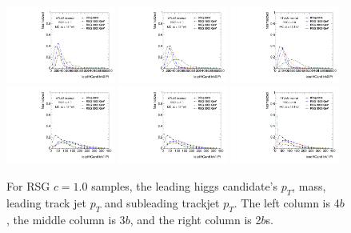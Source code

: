 \begin{figure}[htbp!]
\begin{center}
\includegraphics[width=0.32\textwidth,angle=-90]{figures/boosted/Truth/Moriond_comp_0_FourTag_Signal_leadHCand_trk0_Pt.pdf}
\includegraphics[width=0.32\textwidth,angle=-90]{figures/boosted/Truth/Moriond_comp_0_ThreeTag_Signal_leadHCand_trk0_Pt.pdf}
\includegraphics[width=0.32\textwidth,angle=-90]{figures/boosted/Truth/Moriond_comp_0_TwoTag_split_Signal_leadHCand_trk0_Pt.pdf}\\
\includegraphics[width=0.32\textwidth,angle=-90]{figures/boosted/Truth/Moriond_comp_0_FourTag_Signal_leadHCand_trk1_Pt.pdf}
\includegraphics[width=0.32\textwidth,angle=-90]{figures/boosted/Truth/Moriond_comp_0_ThreeTag_Signal_leadHCand_trk1_Pt.pdf}
\includegraphics[width=0.32\textwidth,angle=-90]{figures/boosted/Truth/Moriond_comp_0_TwoTag_split_Signal_leadHCand_trk1_Pt.pdf}\\
\caption{For RSG $c=1.0$ samples, the leading higgs candidate's $p_T$, mass, leading track jet $p_T$ and subleading trackjet $p_T$. The left column is 4$b$, the middle column is 3$b$, and the right column is 2$b$s.}
\label{fig:app-signal-leadHCand}
\end{center}
\end{figure}



